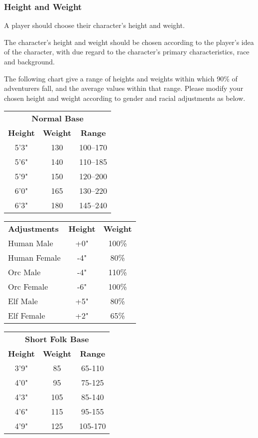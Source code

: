 \begin{multicols*}{3}
\subsubsection{Height and Weight}

A player should choose their character's height and weight.

The character's height and weight should be chosen according to the
player's idea of the character, with due regard to the character's
primary characteristics, race and background.

The following chart give a range of heights and weights within which
90\% of adventurers fall, and the average values within that
range. Please modify your chosen height and weight according to gender
and racial adjustments as below.

\begin{tabular}{ccc}
\multicolumn{3}{c}{\textbf{Normal Base}} \\
\textbf{Height} & \textbf{Weight} & \textbf{Range} \\
5'3"	& 130	& 100--170 \\
5'6"	& 140	& 110--185 \\
5'9"	& 150	& 120--200 \\
6'0"	& 165	& 130--220 \\
6'3"	& 180	& 145--240 \\
\end{tabular}

\begin{tabular}{lcc}
\textbf{Adjustments} & \textbf{Height} &\textbf{Weight} \\
Human Male	& +0"	& 100\% \\
Human Female	& -4"	& 80\% \\
Orc Male	& -4"	& 110\% \\
Orc Female	& -6"	& 100\% \\
Elf Male	& +5"	& 80\% \\
Elf Female	& +2"	& 65\% \\
\end{tabular}

\begin{tabular}{ccc}
\multicolumn{3}{c}{\textbf{Short Folk Base}} \\
\textbf{Height} & \textbf{Weight} & \textbf{Range} \\
3'9"	& 85	& 65-110 \\
4'0"	& 95	& 75-125 \\
4'3"	& 105	& 85-140 \\
4'6"	& 115	& 95-155 \\
4'9"	& 125	& 105-170 \\
\end{tabular}


\end{multicols*}
